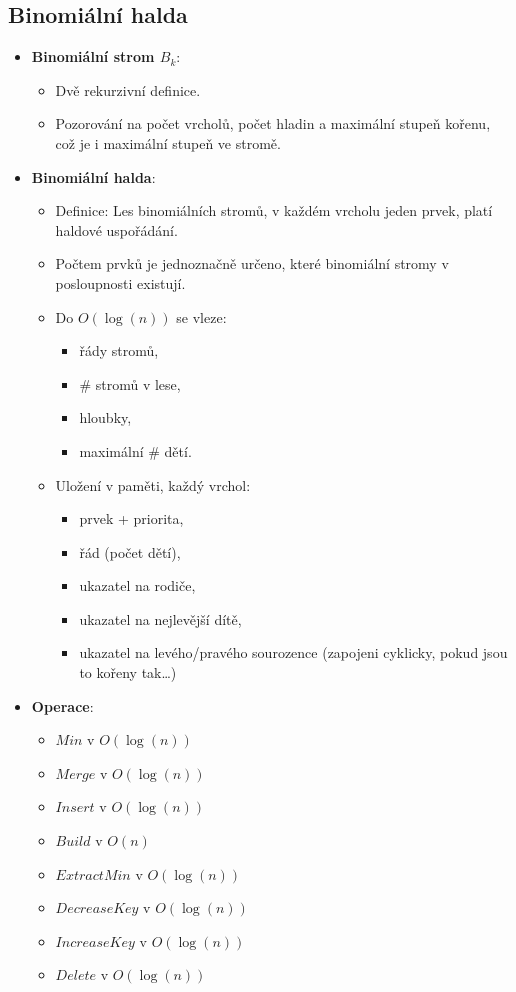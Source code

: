 \documentclass[11pt,a4paper]{article}
\begin{document}
\subsection{Binomiální halda}
\begin{itemize}
    \item \textbf{Binomiální strom $B_k$}:
    \begin{itemize}
        \item Dvě rekurzivní definice.
        \item Pozorování na počet vrcholů, počet hladin a maximální stupeň kořenu, což je i maximální stupeň ve stromě. 
    \end{itemize}
    \item \textbf{Binomiální halda}:
    \begin{itemize}
        \item Definice: Les binomiálních stromů, v každém vrcholu jeden prvek, platí haldové uspořádání.
        \item Počtem prvků je jednoznačně určeno, které binomiální stromy v posloupnosti existují.
        \item Do $O(\log (n))$ se vleze:
        \begin{itemize}
            \item řády stromů,
            \item $\#$ stromů v lese,
            \item hloubky,
            \item maximální $\#$ dětí.
        \end{itemize}
        \item Uložení v paměti, každý vrchol:
        \begin{itemize}
            \item prvek + priorita,
            \item řád (počet dětí),
            \item ukazatel na rodiče,
            \item ukazatel na nejlevější dítě,
            \item ukazatel na levého/pravého sourozence (zapojeni cyklicky, pokud jsou to kořeny tak\dots)
        \end{itemize}
    \end{itemize}
    \item \textbf{Operace}:
    \begin{itemize}
        \item $Min$ v $O(\log(n))$
        \item $Merge$ v $O(\log(n))$
        \item $Insert$ v $O(\log(n))$
        \item $Build$ v $O(n)$
        \item $ExtractMin$ v $O(\log(n))$
        \item $DecreaseKey$ v $O(\log(n))$
        \item $IncreaseKey$ v $O(\log(n))$
        \item $Delete$ v $O(\log(n))$
    \end{itemize}
\end{itemize}
\end{document}
